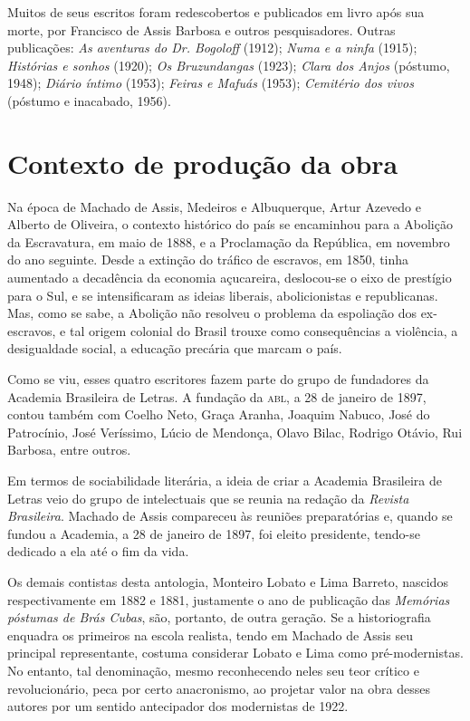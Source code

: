 Muitos de seus escritos foram redescobertos e publicados em livro após
sua morte, por Francisco de Assis Barbosa e outros pesquisadores. Outras
publicações: \emph{As aventuras do Dr. Bogoloff} (1912); \emph{Numa e a
ninfa} (1915); \emph{Histórias e sonhos} (1920); \emph{Os Bruzundangas}
(1923); \emph{Clara dos Anjos} (póstumo, 1948); \emph{Diário íntimo}
(1953); \emph{Feiras e Mafuás} (1953); \emph{Cemitério dos vivos}
(póstumo e inacabado, 1956).

\section{Contexto de produção da obra}

Na época de Machado de Assis, Medeiros e Albuquerque, Artur Azevedo e
Alberto de Oliveira, o contexto histórico do país se encaminhou para a
Abolição da Escravatura, em maio de 1888, e a Proclamação da República,
em novembro do ano seguinte. Desde a extinção do tráfico de escravos, em
1850, tinha aumentado a decadência da economia açucareira, deslocou-se o
eixo de prestígio para o Sul, e se intensificaram as ideias liberais,
abolicionistas e republicanas. Mas, como se sabe, a Abolição não
resolveu o problema da espoliação dos ex-escravos, e tal origem colonial
do Brasil trouxe como consequências a violência, a desigualdade social,
a educação precária que marcam o país.

Como se viu, esses quatro escritores fazem parte do grupo
de fundadores da Academia Brasileira de Letras. A fundação da \textsc{abl}, a 28
de janeiro de 1897, contou também com Coelho Neto, Graça Aranha, Joaquim
Nabuco, José do Patrocínio, José Veríssimo, Lúcio de Mendonça, Olavo
Bilac, Rodrigo Otávio, Rui Barbosa, entre outros.

Em termos de sociabilidade literária, a ideia de criar a Academia
Brasileira de Letras veio do grupo de intelectuais que se reunia na
redação da \emph{Revista Brasileira}. Machado de Assis compareceu às
reuniões preparatórias e, quando se fundou a Academia, a 28 de janeiro
de 1897, foi eleito presidente, tendo-se dedicado a ela até o fim da
vida.

Os demais contistas desta antologia, Monteiro Lobato e Lima Barreto,
nascidos respectivamente em 1882 e 1881, justamente o ano de publicação
das \emph{Memórias póstumas de Brás Cubas}, são, portanto, de outra
geração. Se a historiografia enquadra os primeiros na escola realista,
tendo em Machado de Assis seu principal representante, costuma
considerar Lobato e Lima como pré-modernistas. No entanto, tal
denominação, mesmo reconhecendo neles seu teor crítico e revolucionário,
peca por certo anacronismo, ao projetar valor na obra desses autores por
um sentido antecipador dos modernistas de 1922.

